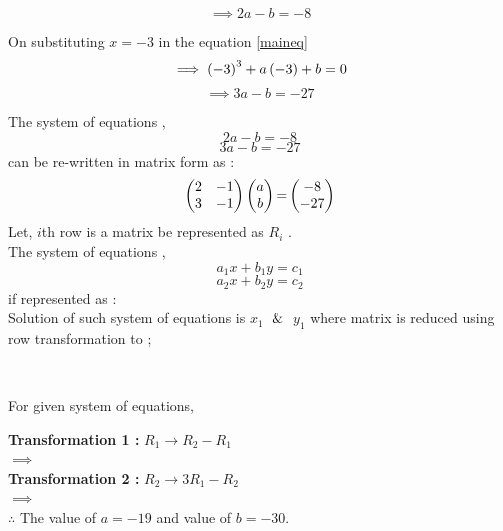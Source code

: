 \documentclass[journal,12pt,twocolumn]{IEEEtran}
\DeclareMathOperator*{\equals}{=}
\begin{document}
    \begin{equation}
    \label{eq1}
        \implies 2a-b=-8
    \end{equation}

    On substituting $x=-3$ in the equation \eqref{maineq}$$\implies \left(-3\right)^3+a\left(-3\right)+b=0$$
    \begin{equation}
    \label{eq2}
        \implies 3a-b=-27
    \end{equation}
    
    The system of equations ,
    $$2a-b=-8$$
    $$3a-b=-27$$
    can be re-written in matrix form as :
    $$\myvec{2&-1\\3&-1}\myvec{a\\b}\equals\myvec{-8\\-27}$$
    Let, $i$th row is a matrix be represented as $R_i$ .\\
    The system of equations ,
    $$a_1x+b_1y=c_1$$
    $$a_2x+b_2y=c_2$$
    if represented as :
    \\
    Solution of such system of equations is $x_1$ $\And$ $y_1$ where matrix is reduced using row transformation to ;\\
    \begin{center}
       \\
    \end{center}
    For given system of equations,\\
    
    \begin{center}
    \end{center}
    \textbf{Transformation 1 :} $R_1 \rightarrow R_2-R_1$\\
    
    $\implies$
    \\
    \textbf{Transformation 2 :} $R_2\rightarrow 3R_1-R_2$\\
    
    $\implies$
    \\
    
    

    $ \therefore $ The value of $a = -19$ and value of $b = -30$.\\
    
\end{document}

